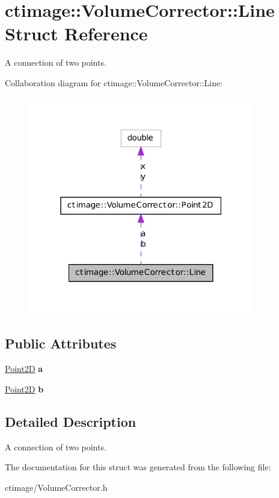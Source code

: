 \hypertarget{structctimage_1_1_volume_corrector_1_1_line}{
\section{ctimage::VolumeCorrector::Line Struct Reference}
\label{structctimage_1_1_volume_corrector_1_1_line}
}


A connection of two points.  




Collaboration diagram for ctimage::VolumeCorrector::Line:\nopagebreak
\begin{figure}[H]
\begin{center}
\leavevmode
\includegraphics[width=280pt]{structctimage_1_1_volume_corrector_1_1_line__coll__graph}
\end{center}
\end{figure}
\subsection*{Public Attributes}
\begin{DoxyCompactItemize}
\item 
\hypertarget{structctimage_1_1_volume_corrector_1_1_line_aff84c86854913816c85a1928a2efcf71}{
\hyperlink{structctimage_1_1_volume_corrector_1_1_point2_d}{Point2D} {\bfseries a}}
\label{structctimage_1_1_volume_corrector_1_1_line_aff84c86854913816c85a1928a2efcf71}

\item 
\hypertarget{structctimage_1_1_volume_corrector_1_1_line_acc253a7ba87122fe96e270a23d220876}{
\hyperlink{structctimage_1_1_volume_corrector_1_1_point2_d}{Point2D} {\bfseries b}}
\label{structctimage_1_1_volume_corrector_1_1_line_acc253a7ba87122fe96e270a23d220876}

\end{DoxyCompactItemize}


\subsection{Detailed Description}
A connection of two points. 

The documentation for this struct was generated from the following file:\begin{DoxyCompactItemize}
\item 
ctimage/VolumeCorrector.h\end{DoxyCompactItemize}
